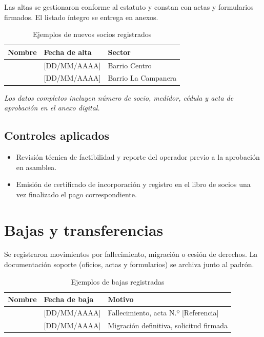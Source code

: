 Las altas se gestionaron conforme al estatuto y constan con actas y formularios firmados. El listado íntegro se entrega en anexos.

\begin{table}[H]
\centering
\caption{Ejemplos de nuevos socios registrados}
\label{tab:nuevos_socios}
\begin{tabular}{p{4.2cm} p{3.3cm} p{4.5cm}}
\toprule
\textbf{Nombre} & \textbf{Fecha de alta} & \textbf{Sector} \\
\midrule
[Nombre socio 1] & [DD/MM/AAAA] & Barrio Centro \\
[Nombre socio 2] & [DD/MM/AAAA] & Barrio La Campanera \\
\bottomrule
\end{tabular}
\end{table}
\textit{Los datos completos incluyen número de socio, medidor, cédula y acta de aprobación en el anexo digital.}

\subsection*{Controles aplicados}
\begin{itemize}[noitemsep, topsep=0pt]
  \item Revisión técnica de factibilidad y reporte del operador previo a la aprobación en asamblea.
  \item Emisión de certificado de incorporación y registro en el libro de socios una vez finalizado el pago correspondiente.
\end{itemize}

\section{Bajas y transferencias}

Se registraron movimientos por fallecimiento, migración o cesión de derechos. La documentación soporte (oficios, actas y formularios) se archiva junto al padrón.

\begin{table}[H]
\centering
\caption{Ejemplos de bajas registradas}
\label{tab:bajas_usuarios}
\begin{tabular}{p{3.6cm} p{3cm} p{4.4cm}}
\toprule
\textbf{Nombre} & \textbf{Fecha de baja} & \textbf{Motivo} \\
\midrule
[Nombre] & [DD/MM/AAAA] & Fallecimiento, acta N.º [Referencia] \\
[Nombre] & [DD/MM/AAAA] & Migración definitiva, solicitud firmada \\
\bottomrule
\end{tabular}
\end{table}

